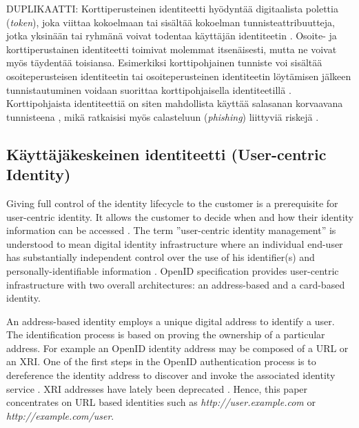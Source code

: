 \documentclass[english,gradu]{tktltiki}
\begin{document}
              DUPLIKAATTI:
Korttiperusteinen identiteetti hyödyntää digitaalista polettia (\emph{token}), joka viittaa kokoelmaan tai sisältää kokoelman tunnisteattribuutteja, jotka yksinään tai ryhmänä voivat todentaa käyttäjän identiteetin \cite{openid_2.0_platform_2009}. Osoite- ja korttiperustainen identiteetti toimivat molemmat itsenäisesti, mutta ne voivat myös täydentää toisiansa. Esimerkiksi korttipohjainen tunniste voi sisältää osoiteperusteisen identiteetin tai osoiteperusteinen identiteetin löytämisen jälkeen tunnistautuminen voidaan suorittaa korttipohjaisella identiteetillä \cite{openid_2.0_platform_2009}. Korttipohjaista identiteettiä on siten mahdollista käyttää salasanan korvaavana tunnisteena \cite{infocards_09}, mikä ratkaisisi myös calasteluun (\emph{phishing}) liittyviä riskejä \cite{cameron_infocard_07}.




\subsection{Käyttäjäkeskeinen identiteetti (User-centric Identity)} %
\label{sub:käyttäjäkeskeinen_identiteetti_user_centric_identity_}

Giving full control of the identity lifecycle to the customer is a prerequisite for user-centric identity. It allows the customer to decide when and how their identity information can be accessed \cite{open_identity_management_saas_2009}. The term ''user-centric identity management'' is understood to mean digital identity infrastructure where an individual end-user has substantially independent control over the use of his identifier(s) and personally-identifiable information \cite{openid_2.0_platform_2009}. OpenID specification provides user-centric infrastructure with two overall architectures: an address-based and a card-based identity.

An address-based identity employs a unique digital address to identify a user. The identification process is based on proving the ownership of a particular address. For example an OpenID identity address may be composed of a URL or an XRI. One of the first steps in the OpenID authentication process is to dereference the identity address to discover and invoke the associated identity service \cite{openid_2.0_platform_2009}. XRI addresses have lately been deprecated \cite{xri_depcrecated_08a, xri_depcrecated_08b, xri_depcrecated_08c, xri_depcrecated_08d}. Hence, this paper concentrates on URL based identities such as \emph{http://user.example.com} or \emph{http://example.com/user}.
\end{document}

